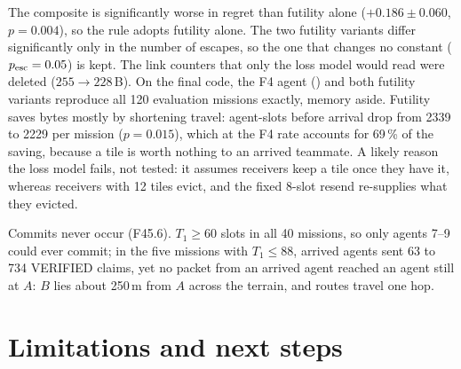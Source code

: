 \documentclass[11pt,a4paper]{article}
\newcommand{\code}[1]{\texttt{\detokenize{#1}}}
\begin{document}
The composite is significantly worse in regret than futility alone ($+0.186\pm0.060$, $p=0.004$), so the rule adopts
futility alone. The two futility variants differ significantly only in the number of escapes, so the one that changes
no constant ($p_{\rm esc}=0.05$) is kept. The link counters that only the loss model would read were deleted
($255\to228$\,B). On the final code, the F4 agent (\code{v2-nofutile}) and both futility variants reproduce all 120
evaluation missions exactly, memory aside. Futility saves bytes mostly by shortening travel: agent-slots before arrival
drop from 2339 to 2229 per mission ($p=0.015$), which at the F4 rate accounts for 69\,\% of the saving, because a tile
is worth nothing to an arrived teammate. A likely reason the loss model fails, not tested: it assumes receivers keep a
tile once they have it, whereas receivers with 12 tiles evict, and the fixed 8-slot resend re-supplies what they
evicted.

Commits never occur (F45.6). $T_1\ge60$ slots in all 40 missions, so only agents 7--9 could ever commit; in the five
missions with $T_1\le88$, arrived agents sent 63 to 734 VERIFIED claims, yet no packet from an arrived agent reached an
agent still at $A$: $B$ lies about 250\,m from $A$ across the terrain, and routes travel one hop.

\section{Limitations and next steps}\label{sec:dev}
\end{document}
